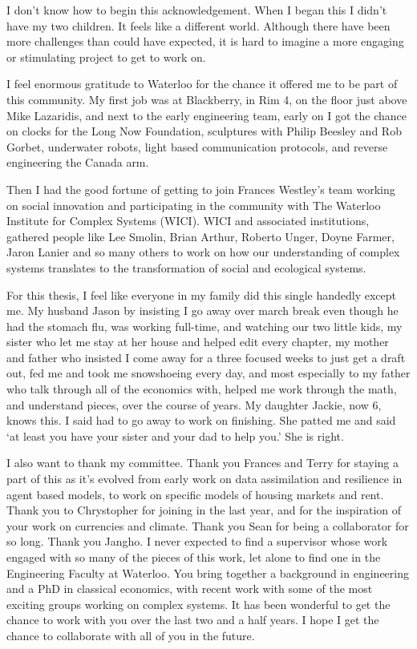 I don't know how to begin this acknowledgement. When I began this I didn't have my two children. It feels like a different world. Although there have been more challenges than could have expected, it is hard to imagine a more engaging or stimulating project to get to work on. 

I feel enormous gratitude to Waterloo for the chance it offered me to be part of this community.  My first job was at Blackberry, in Rim 4, on the floor just above Mike Lazaridis, and next to the early engineering team, early on I got the chance on clocks for the Long Now Foundation, sculptures with Philip Beesley and Rob Gorbet, underwater robots, light based communication protocols, and reverse engineering the Canada arm.

Then I had the good fortune of getting to join Frances Westley's team working on social innovation and participating in the community with The Waterloo Institute for Complex Systems (WICI). WICI  and associated institutions, gathered  people like Lee Smolin, Brian Arthur, Roberto Unger, Doyne Farmer, Jaron Lanier and so many others to work on how our understanding of complex systems translates to the transformation of social and ecological systems. 

For this thesis, I feel like everyone in my family did this single handedly except me. My husband Jason by insisting I go away over march break even though he had the stomach flu, was working full-time, and watching our two little kids, my sister who let me stay at her house and helped edit every chapter, my mother and father who insisted I come away for a three focused weeks to just get a draft out, fed me and took me snowshoeing every day, and most especially to my father who talk through all of the economics with, helped me work through the math, and understand pieces, over the course of years. My daughter Jackie, now 6, knows this. I said had to go away to work on finishing. She patted me and said `at least you have your sister and your dad to help you.' She is right.

I also want to thank my committee. Thank you Frances and Terry for staying a part of this as it's evolved from early work on data assimilation and resilience in agent based models, to work on specific models of housing markets and rent. Thank you to Chrystopher for joining in the last year, and for the inspiration of your work on currencies and climate. Thank you Sean for being a collaborator for so long. Thank you Jangho. I never expected to find a supervisor whose work engaged with so many of the pieces of this work, let alone to find one in the Engineering Faculty at Waterloo. You bring together a background in engineering and a PhD in classical economics, with recent work with some of the most exciting groups working on  complex systems. It has been wonderful to get the chance to work with you over the last two and a half years. I  hope I get the chance to collaborate with all of you in the future. 

